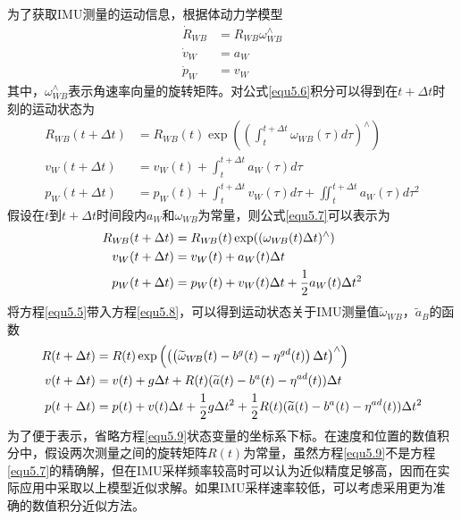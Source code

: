 为了获取IMU测量的运动信息，根据体动力学模型
\begin{equation}
\label{equ5.6}
\begin{aligned}
\dot{R}_{W\!B} &= R_{W\!B}{\omega}_{W\!B}^{\wedge}\\
\dot{v}_W &= a_W \\
\dot{p}_W &= v_W
\end{aligned}
\end{equation}
其中，${\omega}_{W\!B}^{\wedge}$表示角速率向量的旋转矩阵。对公式\ref{equ5.6}积分可以得到在$t+\Delta t$时刻的运动状态为
\begin{equation}
\label{equ5.7}
\begin{aligned}
R_{W\!B}(t+\Delta t) &= R_{W\!B}(t)\exp\left( { \left( \int_t^{t+\Delta t} \! \omega_{W\!B}(\tau) d\tau \right)^{\wedge} } \right) \\
v_W(t+\Delta t) &= v_W(t) + \int_t^{t+\Delta t} \! a_W(\tau) d\tau \\
p_W(t+\Delta t) &= p_W(t) + \int_t^{t+\Delta t} \! v_W(\tau) d\tau + \iint_t^{t+\Delta t} \! a_W(\tau)d\tau ^2
\end{aligned}
\end{equation}
假设在$t$到$t+\Delta t$时间段内$a_W$和$\omega_{W\!B}$为常量，则公式\ref{equ5.7}可以表示为
\begin{equation}
\label{equ5.8}
\begin{aligned}
R_{W\!B}(t+\Delta t) &= R_{W\!B}(t) \exp(( \omega_{W\!B}(t)\Delta t )^{\wedge}) \\
v_W(t+\Delta t) &= v_W(t)+a_W(t)\Delta t \\
p_W(t+\Delta t) &= p_W(t)+v_W(t)\Delta t + {1 \over 2} a_W(t)\Delta t^2
\end{aligned}
\end{equation}
将方程\ref{equ5.5}带入方程\ref{equ5.8}，可以得到运动状态关于IMU测量值$\widetilde{\omega}_{W\!B}$，$\widetilde{a}_B$的函数
\begin{equation}
\label{equ5.9}
\begin{aligned}
R(t+\Delta t) &= R(t)\exp \left( \left(  \left( \widetilde{\omega}_{W\!B}(t)-b^g(t)-\eta^{gd}(t) \right) \Delta t \right)^{\wedge}  \right) \\ 
v(t+\Delta t) &= v(t)+g \Delta t + R(t)(\widetilde{a}(t)-b^a(t)-\eta^{ad}(t))\Delta t \\
p(t+\Delta t) &= p(t)+v(t)\Delta t + {1 \over 2}g\Delta t^2 + {1 \over 2}R(t)(\widetilde{a}(t)-b^a(t)-\eta^{ad}(t))\Delta t^2
\end{aligned}
\end{equation}
为了便于表示，省略方程\ref{equ5.9}状态变量的坐标系下标。在速度和位置的数值积分中，假设两次测量之间的旋转矩阵$R(t)$为常量，虽然方程\ref{equ5.9}不是方程\ref{equ5.7}的精确解，但在IMU采样频率较高时可以认为近似精度足够高，因而在实际应用中采取以上模型近似求解。如果IMU采样速率较低，可以考虑采用更为准确的数值积分近似方法。

